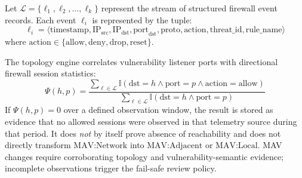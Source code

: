 Let $\mathcal{L} = \{\ell_1, \ell_2, \dots, \ell_k\}$ represent the stream of structured firewall event records. Each event $\ell_i$ is represented by the tuple:
\begin{equation}
    \ell_i = \langle \text{timestamp}, \text{IP}_{\text{src}}, \text{IP}_{\text{dst}}, \text{port}_{\text{dst}}, \text{proto}, \text{action}, \text{threat\_id}, \text{rule\_name} \rangle
\end{equation}
where $\text{action} \in \{\text{allow}, \text{deny}, \text{drop}, \text{reset}\}$.

The topology engine correlates vulnerability listener ports with directional firewall session statistics:
\begin{equation}
    \Psi(h, p) = \frac{\sum_{\ell \in \mathcal{L}} \mathbb{I}(\text{dst}=h \land \text{port}=p \land \text{action}=\text{allow})}{\sum_{\ell \in \mathcal{L}} \mathbb{I}(\text{dst}=h \land \text{port}=p)}
\end{equation}
If $\Psi(h, p)=0$ over a defined observation window, the result is stored as evidence that no allowed sessions were observed in that telemetry source during that period. It does \emph{not} by itself prove absence of reachability and does not directly transform $\text{MAV:Network}$ into $\text{MAV:Adjacent}$ or $\text{MAV:Local}$. MAV changes require corroborating topology and vulnerability-semantic evidence; incomplete observations trigger the fail-safe review policy.

